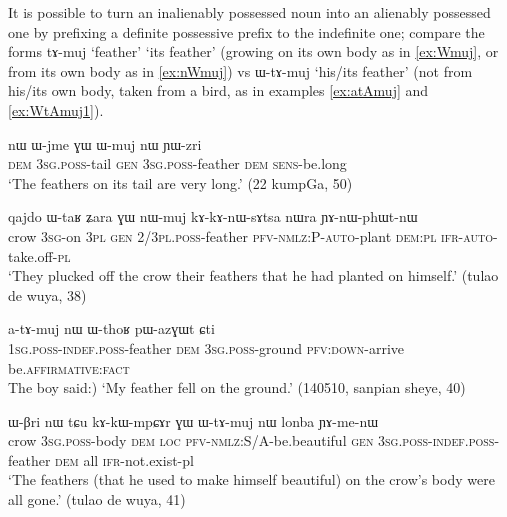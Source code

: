 \documentclass[oldfontcommands,oneside,a4paper,11pt]{article}
\newcommand{\ipa}[1]{{\phon #1}} %
\begin{document}
It is possible to turn an inalienably possessed noun into an alienably possessed one by prefixing a definite possessive prefix to the indefinite one; compare the forms \ipa{tɤ-muj} `feather' `its feather' (growing on its own body as in \ref{ex:Wmuj}, or from its own body as in \ref{ex:nWmuj}) vs \ipa{ɯ-tɤ-muj} `his/its feather' (not from his/its own body, taken from a bird, as in examples \ref{ex:atAmuj} and \ref{ex:WtAmuj1}).


\begin{exe}
\ex \label{ex:Wmuj}
\gll 
\ipa{nɯ} 	\ipa{ɯ-jme} 	\ipa{ɣɯ} 	\ipa{ɯ-muj} 	\ipa{nɯ} 	\ipa{ɲɯ-zri} \\
\textsc{dem} \textsc{3sg.poss}-tail \textsc{gen} \textsc{3sg.poss}-feather \textsc{dem}  \textsc{sens}-be.long \\
\glt `The feathers on its tail are very long.' (22 kumpGa, 50)
\end{exe}

\begin{exe}
\ex \label{ex:nWmuj}
\gll 
\ipa{qajdo} 	\ipa{ɯ-taʁ} 	\ipa{ʑara} 	\ipa{ɣɯ} 	\ipa{nɯ-muj} 	\ipa{kɤ-kɤ-nɯ-sɤtsa} 	\ipa{nɯra} 	\ipa{ɲɤ-nɯ-phɯt-nɯ} \\
crow \textsc{3sg}-on \textsc{3pl} \textsc{gen} \textsc{2/3pl.poss}-feather \textsc{pfv-nmlz:P-auto}-plant \textsc{dem:pl} \textsc{ifr-auto}-take.off-\textsc{pl} \\
\glt `They plucked off the crow their feathers that he had planted on himself.' (tulao de wuya, 38)
\end{exe}

\begin{exe}
\ex \label{ex:atAmuj}
\gll 
\ipa{a-tɤ-muj} 	\ipa{nɯ} 	\ipa{ɯ-thoʁ} 	\ipa{pɯ-azɣɯt} 	\ipa{ɕti} \\
\textsc{1sg.poss-indef.poss}-feather \textsc{dem}  \textsc{3sg.poss}-ground \textsc{pfv:down}-arrive be.\textsc{affirmative:fact} \\
\glt The boy said:) `My feather fell on the ground.' (140510, sanpian sheye, 40)
\end{exe}

\begin{exe}
\ex \label{ex:WtAmuj1}
\gll \ipa{qajdo}  	\ipa{ɯ-βri}  	\ipa{nɯ} \ipa{tɕu}  	\ipa{kɤ-kɯ-mpɕɤr}  	\ipa{ɣɯ}  	\ipa{ɯ-tɤ-muj}  	\ipa{nɯ}  	 	\ipa{lonba}  	\ipa{ɲɤ-me-nɯ}  \\
crow \textsc{3sg.poss}-body \textsc{dem} \textsc{loc} \textsc{pfv-nmlz}:S/A-be.beautiful \textsc{gen} \textsc{3sg.poss-indef.poss}-feather  \textsc{dem} all \textsc{ifr}-not.exist-pl \\
\glt `The feathers (that he used to make himself beautiful) on the crow's body were all gone.' (tulao de wuya, 41)
\end{exe}
\end{document}
